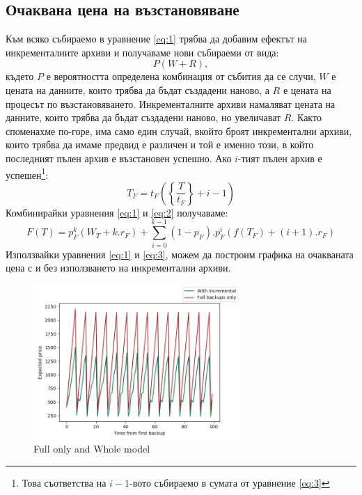 \documentclass[11pt, a4paper]{article}
\theoremstyle{definition}
\begin{document}
			\subsection{Очаквана цена на възстановяване}
				Към всяко събираемо в уравнение \ref{eq:1} трябва да добавим ефектът на инкременталните архиви и получаваме нови събираеми от вида:
				$$
				P(W + R),
				$$
				където $P$ е вероятността определена комбинация от събития да се случи, $W$ е цената на данните, които трябва да бъдат създадени наново, а $R$ е цената на процесът по възстановяването. Инкременталните архиви намаляват цената на данните, които трябва да бъдат създадени наново, но увеличават $R$. Както споменахме по-горе, има само един случай, вкойто броят инкрементални архиви, които трябва да имаме предвид е различен и той е именно този, в който последният пълен архив е възстановен успешно. Ако $i$-тият пълен архив е успешен\footnote{Това съответства на $i-1$-вото събираемо в сумата от уравнение \ref{eq:3}}:
				$$
				T_F=t_F\left(\left\{ \frac{T}{t_F} \right\} + i - 1\right)
				$$
				Комбинирайки уравнения \ref{eq:1} и \ref{eq:2} получаваме:
				\begin{equation}\label{eq:3}
				F(T) = p_F^{k}(W_T+k.r_F) + \displaystyle\sum_{i=0}^{k-1}(1-p_F).p_F^{i}\left(f(T_F) + (i+1).r_F\right)
				\end{equation}
				Използвайки уравнения \ref{eq:1} и \ref{eq:3}, можем да построим графика на очакваната цена с и без използването на инкрементални архиви.
				\begin{figure}[H]
					\begin{minipage}{1.0\textwidth}
						\centering
						\includegraphics[width=0.7\textwidth]{Weekly_full.png}
						\caption{Full only and Whole model}\label{Fig:FullWeekly}
					\end{minipage}
				\end{figure}
\end{document}
